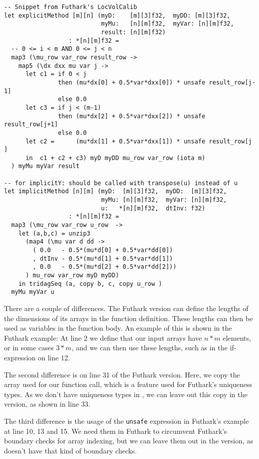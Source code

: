 \begin{lstlisting}[language=Futhark]
-- Snippet from Futhark's LocVolCalib
let explicitMethod [m][n] (myD:    [m][3]f32,  myDD: [m][3]f32,
                           myMu:   [n][m]f32,  myVar: [n][m]f32,
                           result: [n][m]f32)
                  : *[n][m]f32 =
  -- 0 <= i < m AND 0 <= j < n
  map3 (\mu_row var_row result_row ->
    map5 (\dx dxx mu var j ->
      let c1 = if 0 < j
               then (mu*dx[0] + 0.5*var*dxx[0]) * unsafe result_row[j-1]
               else 0.0
      let c3 = if j < (m-1)
               then (mu*dx[2] + 0.5*var*dxx[2]) * unsafe result_row[j+1]
               else 0.0
      let c2 =      (mu*dx[1] + 0.5*var*dxx[1]) * unsafe result_row[j  ]
      in  c1 + c2 + c3) myD myDD mu_row var_row (iota m)
  ) myMu myVar result

-- for implicitY: should be called with transpose(u) instead of u
let implicitMethod [n][m] (myD:  [m][3]f32,  myDD:  [m][3]f32,
                           myMu: [n][m]f32,  myVar: [n][m]f32,
                           u:   *[n][m]f32,  dtInv: f32)
                  : *[n][m]f32 =
  map3 (\mu_row var_row u_row  ->
    let (a,b,c) = unzip3 
      (map4 (\mu var d dd ->
        ( 0.0   - 0.5*(mu*d[0] + 0.5*var*dd[0])
        , dtInv - 0.5*(mu*d[1] + 0.5*var*dd[1])
        , 0.0   - 0.5*(mu*d[2] + 0.5*var*dd[2]))
      ) mu_row var_row myD myDD)
    in tridagSeq (a, copy b, c, copy u_row )
  myMu myVar u
\end{lstlisting}
There are a couple of differences. The Futhark version can define the lengths of
the dimensions of its arrays in the function definition. These lengths can then
be used as variables in the function body. An example of this is shown in the
Futhark example: At line 2 we define that our input arrays have $n*m$ elements,
or in some cases $3*m$, and we can then use these lengths, such as in the
if-expression on line 12.

The second difference is on line 31 of the Futhark version. Here, we copy the
array used for our function call, which is a feature used for Futhark's
uniqueness types\cite{uniqueness}.
As we don't have uniqueness types in \fshark{}, we can leave out this copy in
the \fshark{} version, as shown in line 33.

The third difference is the usage of the \texttt{unsafe} expression in Futhark's
example at line 10, 13 and 15. We need them in Futhark to circumvent Futhark's
boundary checks for array indexing, but we can leave them out in the \fshark{}
version, as \fshark{} doesn't have that kind of boundary checks.

